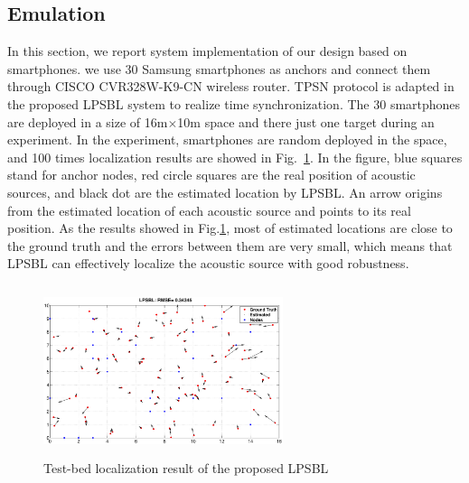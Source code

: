 \subsection{Emulation}


In this section, we report system implementation of our design based on smartphones.
we use 30 Samsung smartphones as anchors and connect them through CISCO CVR328W-K9-CN wireless router. 
TPSN protocol is adapted in the proposed LPSBL system to realize time synchronization.
The 30 smartphones are deployed in a size of 16m$\times$10m space and there just one target during an experiment.
In the experiment, smartphones are random deployed in the space, and 100 times localization results are showed in Fig.~\ref{fig7}. 
In the figure, blue squares stand for anchor
nodes, red circle squares are the real position of acoustic sources, and black dot are the estimated location by LPSBL. 
An arrow origins from the estimated location of each acoustic source and points to its real position. 
As the results showed in Fig.\ref{fig7}, most of estimated locations are close to the ground truth and the errors between them are very small,
which means that LPSBL can effectively localize the acoustic source with good robustness.
  \begin{figure}[htb]
			    \vspace{-12mm}
            \includegraphics[height=5.0cm,width=7.0cm]{image/emulation.eps}
            \vspace{12mm}
            \caption{Test-bed localization result of the proposed LPSBL}
             \vspace{-5mm}
             \label{fig7}
        \end{figure}
